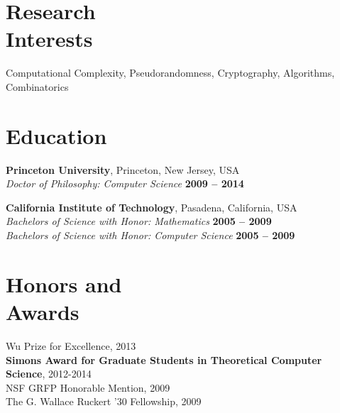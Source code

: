 \documentclass[margin,line]{resume}
\begin{document}
\begin{resume}
    \section{\mysidestyle Research\\Interests}

    Computational Complexity, Pseudorandomness, Cryptography, Algorithms, Combinatorics \\

    \section{\mysidestyle Education}

    \textbf{Princeton University}, Princeton, New Jersey, USA \vspace{2mm}\\\vspace{1mm}%
    \textsl{Doctor of Philosophy: Computer Science} \hfill \textbf{ 2009 -- 2014 }\vspace{-3mm}\\\vspace{-1mm}%

    \textbf{California Institute of Technology}, Pasadena, California, USA \vspace{2mm}\\\vspace{1mm}%
    \textsl{Bachelors of Science with Honor: Mathematics} \hfill \textbf{ 2005 -- 2009}\\
    \textsl{Bachelors of Science with Honor: Computer Science} \hfill \textbf{ 2005 -- 2009}\vspace{-3mm}\\%

    \section{\mysidestyle Honors and\\Awards} 

    Wu Prize for Excellence, 2013 \vspace{1mm}\\
    {\bf Simons Award for Graduate Students in Theoretical Computer Science}, 2012-2014		    \vspace{1mm}\\
    NSF GRFP Honorable Mention, 2009								    \vspace{1mm}\\%
    The G. Wallace Ruckert '30 Fellowship, 2009 						    \vspace{1mm}\\%


\end{resume}
\end{document}
